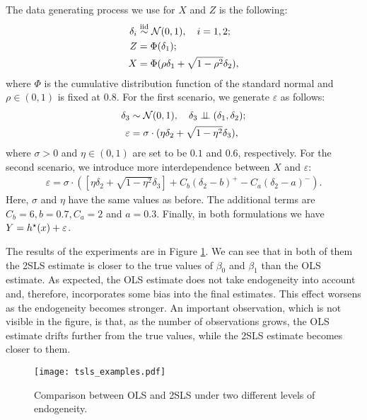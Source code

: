 The data generating process we use for $ X $ and $ Z $ is the following:
\begin{align*}
    \delta_{ i } &\overset{\mathrm{iid}}{\sim} \mathcal{N} ( 0, 1 ), \quad i = 1, 2; \\
    Z &= \Phi ( \delta_{ 1 } ); \\
    X &= \Phi ( \rho \delta_{ 1 } + \sqrt{ 1 - \rho^2 } \delta_{ 2 } )
,\end{align*}
where $ \Phi $ is the cumulative distribution function of the standard normal and $ \rho \in ( 0, 1 ) $ is fixed at $ 0.8 $.
For the first scenario, we generate $ \varepsilon $ as follows:
\begin{align*}
    \delta_{ 3 } &\sim \mathcal{N} ( 0, 1 ), \quad \delta_{ 3 } \perp\mkern-9.5mu\perp ( \delta_{ 1 }, \delta_{ 2 } ); \\
    \varepsilon &= \sigma \cdot ( \eta \delta_{ 2 } + \sqrt{ 1 - \eta^2 } \delta_{ 3 } )
,\end{align*}
where $ \sigma > 0 $ and $ \eta \in ( 0, 1 ) $ are set to be $ 0.1 $ and $ 0.6 $, respectively.
For the second scenario, we introduce more interdependence between $ X $ and $ \varepsilon $:
\begin{align*}
    \varepsilon = \sigma \cdot \left(
        \left[ \eta \delta_{ 2 } + \sqrt{ 1 - \eta^2 } \delta_{ 3 } \right]
        + C_{ b } ( \delta_{ 2 } - b )^{ + } - C_{ a } ( \delta_{ 2 } - a )^{ - }
    \right)
.\end{align*}
Here, $ \sigma $ and $ \eta $ have the same values as before.
The additional terms are $ C_{ b } = 6, b = 0.7, C_{ a } = 2 $ and $ a = 0.3 $.
Finally, in both formulations we have $ Y = h^{ \star } ( x ) + \varepsilon $.

The results of the experiments are in Figure \ref{fig: 2sls vs ols}.
We can see that in both of them the 2SLS estimate is closer to the true values of $ \beta_{ 0 } $ and $ \beta_{ 1 } $ than the OLS estimate.
As expected, the OLS estimate does not take endogeneity into account and, therefore, incorporates some bias into the final estimates.
This effect worsens as the endogeneity becomes stronger.
An important observation, which is not visible in the figure, is that, as the number of observations grows, the OLS estimate drifts further from the true values, while the 2SLS estimate becomes closer to them.

\begin{figure}[htb]
    \begin{center}
        \texttt{[image: tsls\_examples.pdf]}
    \end{center}
    \caption{Comparison between OLS and 2SLS under two different levels of endogeneity.}
    \label{fig: 2sls vs ols}
\end{figure}


